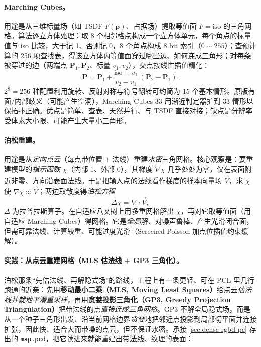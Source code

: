\paragraph{Marching Cubes。}
用途是从三维标量场（如 TSDF $F(\mathbf{p})$、占据场）提取等值面 $F=\text{iso}$ 的三角网格\cite{lorensen1987marchingcubes}。算法逐立方体处理：取 8 个相邻格点构成一个立方体单元，每个角点的标量值与 iso 比较，大于记 1、否则记 0，8 个角点构成 8 bit 索引（$0\sim255$）；查预计算的 256 项查找表，得该立方体内等值面穿过哪些边、如何连成三角形；对每条被穿过的边（两端点 $\mathbf{P}_1,\mathbf{P}_2$、标量 $v_1,v_2$），交点按线性插值精化：
\begin{equation}
  \mathbf{P}=\mathbf{P}_1+\frac{\text{iso}-v_1}{v_2-v_1}\,(\mathbf{P}_2-\mathbf{P}_1).
  \label{eq:dense-mc-interp}
\end{equation}
$2^8=256$ 种配置利用旋转、反射对称与符号翻转可约简为 15 个基本情形。原版有面/内部歧义（可能产生空洞），Marching Cubes 33 用渐近判定器扩到 33 情形以保拓扑正确。优点是简单、查表、天然并行、与 TSDF 直接对接；缺点是分辨率受体素大小限、可能产生大量小三角形。

\paragraph{泊松重建。}
用途是从\emph{定向点云}（每点带位置 $+$ 法线）重建\emph{水密}三角网格\cite{kazhdan2006poisson}。核心观察是：要重建模型的\emph{指示函数} $\chi$（内部 1、外部 0），其梯度 $\nabla\chi$ 几乎处处为零，仅在表面附近非零、方向沿表面法线。于是把输入点的法线看作梯度的样本向量场 $\vec{V}$，求 $\chi$ 使 $\nabla\chi\approx\vec{V}$；两边取散度得\emph{泊松方程}
\begin{equation}
  \Delta\chi=\nabla\cdot\vec{V},
  \label{eq:dense-poisson}
\end{equation}
$\Delta$ 为拉普拉斯算子。在自适应八叉树上用多重网格解出 $\chi$，再对它取等值面（用自适应 Marching Cubes）得网格。它是\emph{全局}解、对噪声鲁棒、产生光滑闭合面，但需可靠法线、计算较重、可能过度光滑（Screened Poisson 加点位插值约束缓解）。

\paragraph{实践：从点云重建网格（MLS 估法线 $+$ GP3 三角化）。}
泊松那条“先估法线、再解隐式场”的路线，工程上有一条更轻、可在 PCL 里几行跑通的近亲：先用\textbf{移动最小二乘（MLS, Moving Least Squares）}\cite{alexa2003pointset}给点云\emph{估法线并就地平滑重采样}，再用\textbf{贪婪投影三角化（GP3, Greedy Projection Triangulation）}\cite{marton2009fast}把带法线的点\emph{直接连成三角网格}。GP3 不解全局隐式场，而是从一个种子三角形出发、沿当前网格边界\emph{贪婪}地把邻近点投影到局部切平面并连接扩张，因此快、适合大而带噪的点云，但不保证水密。承接 \cref{sec:dense-rgbd-pc} 存出的 \texttt{map.pcd}，把它读进来就能重建出带法线、纹理的表面：


